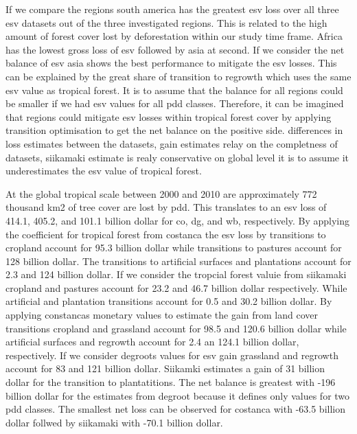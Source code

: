 		 If we compare the regions south america has the greatest esv loss over all three esv datasets out of the three investigated regions. This is related to the high amount of forest cover lost by deforestation within our study time frame. Africa has the lowest gross loss of esv followed by asia at second. If we consider the net balance of esv asia shows the best performance to mitigate the esv losses. This can be explained by the great share of transition to regrowth which uses the same esv value as tropical forest. It is to assume that the balance for all regions could be smaller if we had esv values for all pdd classes. Therefore, it can be imagined that regions could mitigate esv losses within tropical forest cover by applying transition optimisation to get the net balance on the positive side. differences in loss estimates between the datasets, gain estimates relay on the completness of datasets, siikamaki estimate is realy conservative on global level it is to assume it underestimates the esv value of tropical forest. 

		 At the global tropical scale between 2000 and 2010 are approximately 772 thousand km2 of tree cover are lost by pdd. This translates to an esv loss of 414.1, 405.2, and 101.1 billion dollar for co, dg, and wb, respectively. By applying the coefficient for tropical forest from costanca the esv loss by transitions to cropland account for 95.3 billion dollar while transitions to pastures account for 128 billion dollar. The transitions to artificial surfaces and plantations account for 2.3 and 124 billion dollar. If we consider the tropcial forest valuie from siikamaki cropland and pastures account for 23.2 and 46.7 billion dollar respectively. While artificial and plantation transitions account for 0.5 and 30.2 billion dollar. By applying constancas monetary values to estimate the gain from land cover transitions cropland and grassland account for 98.5 and 120.6 billion dollar while artificial surfaces and regrowth account for 2.4 an 124.1 billion dollar, respectively. If we consider degroots values for esv gain grassland and regrowth account for 83 and 121 billion dollar. Siikamki estimates a gain of 31 billion dollar for the transition to plantatitions. The net balance is greatest with -196 billion dollar for the estimates from degroot because it defines only values for two pdd classes. The smallest net loss can be observed for costanca with -63.5 billion dollar follwed by siikamaki with -70.1 billion dollar. 


